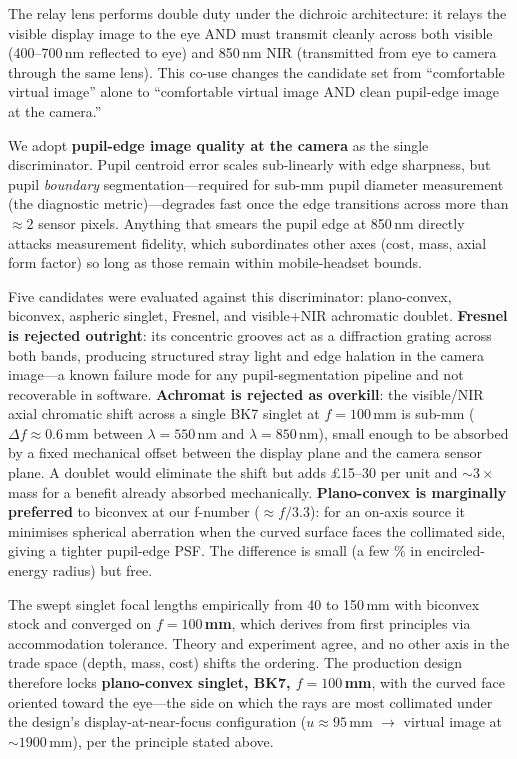 The relay lens performs double duty under the dichroic architecture: it relays the visible display image to the eye AND must transmit cleanly across both visible (400--700\,nm reflected to eye) and 850\,nm NIR (transmitted from eye to camera through the same lens). This co-use changes the candidate set from ``comfortable virtual image'' alone to ``comfortable virtual image AND clean pupil-edge image at the camera.''

We adopt \textbf{pupil-edge image quality at the camera} as the single discriminator. Pupil centroid error scales sub-linearly with edge sharpness, but pupil \textit{boundary} segmentation---required for sub-mm pupil diameter measurement (the diagnostic metric)---degrades fast once the edge transitions across more than $\approx 2$ sensor pixels. Anything that smears the pupil edge at 850\,nm directly attacks measurement fidelity, which subordinates other axes (cost, mass, axial form factor) so long as those remain within mobile-headset bounds.

Five candidates were evaluated against this discriminator: plano-convex, biconvex, aspheric singlet, Fresnel, and visible+NIR achromatic doublet. \textbf{Fresnel is rejected outright}: its concentric grooves act as a diffraction grating across both bands, producing structured stray light and edge halation in the camera image---a known failure mode for any pupil-segmentation pipeline and not recoverable in software. \textbf{Achromat is rejected as overkill}: the visible/NIR axial chromatic shift across a single BK7 singlet at $f = 100$\,mm is sub-mm ($\Delta f \approx 0.6$\,mm between $\lambda = 550$\,nm and $\lambda = 850$\,nm), small enough to be absorbed by a fixed mechanical offset between the display plane and the camera sensor plane. A doublet would eliminate the shift but adds \pounds 15--30 per unit and ${\sim}3\times$ mass for a benefit already absorbed mechanically. \textbf{Plano-convex is marginally preferred} to biconvex at our f-number ($\approx f/3.3$): for an on-axis source it minimises spherical aberration when the curved surface faces the collimated side, giving a tighter pupil-edge PSF. The difference is small (a few \% in encircled-energy radius) but free.

The  swept singlet focal lengths empirically from 40 to 150\,mm with biconvex stock and converged on \textbf{$f = 100$\,mm}, which  derives from first principles via accommodation tolerance. Theory and experiment agree, and no other axis in the trade space (depth, mass, cost) shifts the ordering. The production design therefore locks \textbf{plano-convex singlet, BK7, $f = 100$\,mm}, with the curved face oriented toward the eye---the side on which the rays are most collimated under the design's display-at-near-focus configuration ($u \approx 95$\,mm $\to$ virtual image at ${\sim}1900$\,mm), per the principle stated above.

